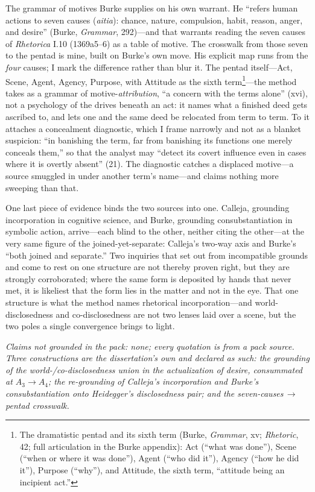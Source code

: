 \documentclass{article}
\begin{document}
The grammar of motives Burke supplies on his own warrant. He ``refers human actions to seven causes (\textit{aitia}): chance, nature, compulsion, habit, reason, anger, and desire'' (Burke, \textit{Grammar}, 292)---and that warrants reading the seven causes of \textit{Rhetorica} I.10 (1369a5--6) as a table of motive. The crosswalk from those seven to the pentad is mine, built on Burke's own move. His explicit map runs from the \textit{four} causes; I mark the difference rather than blur it. The pentad itself---Act, Scene, Agent, Agency, Purpose, with Attitude as the sixth term\footnote{The dramatistic pentad and its sixth term (Burke, \textit{Grammar}, xv; \textit{Rhetoric}, 42; full articulation in the Burke appendix): Act (``what was done''), Scene (``when or where it was done''), Agent (``who did it''), Agency (``how he did it''), Purpose (``why''), and Attitude, the sixth term, ``attitude being an incipient act.''}---the method takes as a grammar of motive-\textit{attribution}, ``a concern with the terms alone'' (xvi), not a psychology of the drives beneath an act: it names what a finished deed gets ascribed to, and lets one and the same deed be relocated from term to term. To it attaches a concealment diagnostic, which I frame narrowly and not as a blanket suspicion: ``in banishing the term, far from banishing its functions one merely conceals them,'' so that the analyst may ``detect its covert influence even in cases where it is overtly absent'' (21). The diagnostic catches a displaced motive---a source smuggled in under another term's name---and claims nothing more sweeping than that.

One last piece of evidence binds the two sources into one. Calleja, grounding incorporation in cognitive science, and Burke, grounding consubstantiation in symbolic action, arrive---each blind to the other, neither citing the other---at the very same figure of the joined-yet-separate: Calleja's two-way axis and Burke's ``both joined and separate.'' Two inquiries that set out from incompatible grounds and come to rest on one structure are not thereby proven right, but they are strongly corroborated; where the same form is deposited by hands that never met, it is likeliest that the form lies in the matter and not in the eye. That one structure is what the method names rhetorical incorporation---and world-disclosedness and co-disclosedness are not two lenses laid over a scene, but the two poles a single convergence brings to light.

\bigskip
\noindent\textit{Claims not grounded in the pack: none; every quotation is from a pack source. Three constructions are the dissertation's own and declared as such: the grounding of the world-/co-disclosedness union in the actualization of desire, consummated at $A_3 \rightarrow A_4$; the re-grounding of Calleja's incorporation and Burke's consubstantiation onto Heidegger's disclosedness pair; and the seven-causes\,$\rightarrow$\,pentad crosswalk.}
\end{document}

